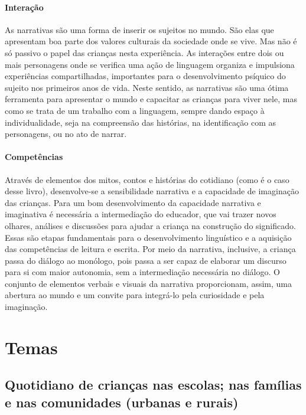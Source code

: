\documentclass[11pt]{extarticle}
\begin{document}
\paragraph{Interação} As narrativas são uma forma de inserir os sujeitos no mundo. 
São elas que apresentam boa parte dos valores culturais da sociedade 
onde se vive. Mas não é só passivo o papel das crianças nesta experiência. 
As interações entre dois ou mais personagens onde se verifica
uma ação de linguagem organiza e impulsiona experiências compartilhadas,
importantes para o desenvolvimento psíquico do sujeito nos primeiros anos de vida.
Neste sentido, as narrativas são uma ótima ferramenta para
apresentar o mundo e capacitar as crianças para viver nele, mas como se
trata de um trabalho com a linguagem, sempre dando espaço à individualidade, 
seja na compreensão das histórias, na identificação com as personagens, ou 
no ato de narrar.

\paragraph{Competências} 
Através de elementos dos mitos, contos e histórias do cotidiano (como é o caso desse livro), desenvolve-se a sensibilidade narrativa e a capacidade de imaginação das crianças. Para um bom desenvolvimento da capacidade narrativa e imaginativa é necessária a intermediação do educador, que vai trazer novos olhares, análises e discussões para ajudar a criança na construção do significado. Essas são etapas fundamentais para o desenvolvimento linguístico e a aquisição das competências de leitura e escrita. Por meio da narrativa, inclusive, a criança passa do diálogo ao monólogo, pois passa a ser capaz de elaborar um discurso para si com maior autonomia, sem a intermediação necessária no diálogo.
O conjunto de elementos verbais e visuais da narrativa proporcionam, assim,
uma abertura ao mundo e um convite para integrá-lo pela curiosidade e pela imaginação.


\section{Temas}

\subsection{Quotidiano de crianças nas escolas; nas famílias e nas comunidades (urbanas e rurais)}

\end{document}
